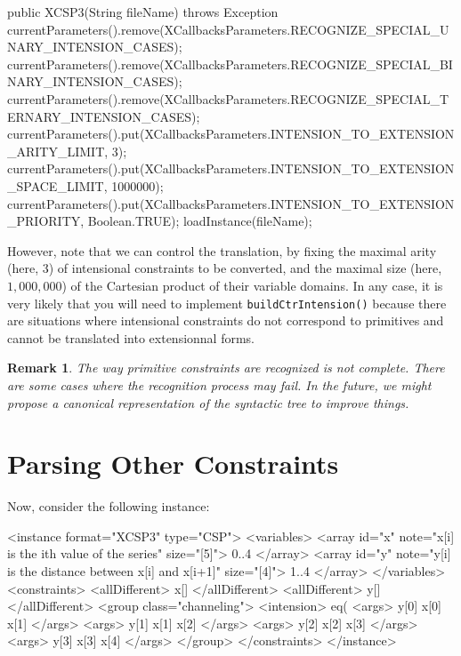 \documentclass[10pt]{article}
\newenvironment{boxabsc}
               {\medskip \begin{bclogo}[barre=none,arrondi=0.2,logo=]{}\vspace{-0.6cm}}
               {\vspace{-0.1cm}\end{bclogo} \smallskip}
\newtheorem{remark}{Remark}
\newcommand{\nn}[1]{{\tt #1}} %
\begin{document}
\begin{boxabsc}
\begin{absc}
public XCSP3(String fileName) throws Exception {
  currentParameters().remove(XCallbacksParameters.RECOGNIZE_SPECIAL_UNARY_INTENSION_CASES);
  currentParameters().remove(XCallbacksParameters.RECOGNIZE_SPECIAL_BINARY_INTENSION_CASES); 
  currentParameters().remove(XCallbacksParameters.RECOGNIZE_SPECIAL_TERNARY_INTENSION_CASES);
  currentParameters().put(XCallbacksParameters.INTENSION_TO_EXTENSION_ARITY_LIMIT, 3); 
  currentParameters().put(XCallbacksParameters.INTENSION_TO_EXTENSION_SPACE_LIMIT, 1000000);
  currentParameters().put(XCallbacksParameters.INTENSION_TO_EXTENSION_PRIORITY, Boolean.TRUE);
  loadInstance(fileName); 
}
\end{absc} 
\end{boxabsc}

However, note that we can control the translation, by fixing the maximal arity (here, 3) of intensional constraints to be converted, and the maximal size (here, $1,000,000$) of the Cartesian product of their variable domains. 
In any case, it is very likely that you will need to implement \nn{buildCtrIntension()} because there are situations where intensional constraints do not correspond to primitives and cannot be translated into extensionnal forms.


\begin{remark}
The way primitive constraints are recognized is not complete. There are some cases where the recognition process may fail.
In the future, we might propose a canonical representation of the syntactic tree to improve things.
\end{remark}

\section{Parsing Other Constraints}

Now, consider the following instance:

\begin{boxabsc}
\begin{absc}
<instance format="XCSP3" type="CSP">
  <variables>
    <array id="x" note="x[i] is the ith value of the series" size="[5]"> 0..4 </array>
    <array id="y" note="y[i] is the distance between x[i] and x[i+1]" size="[4]"> 1..4 </array>
  </variables>
  <constraints>
    <allDifferent> x[] </allDifferent>
    <allDifferent> y[] </allDifferent>
    <group class="channeling">
      <intension> eq(%
      <args> y[0] x[0] x[1] </args>
      <args> y[1] x[1] x[2] </args>
      <args> y[2] x[2] x[3] </args>
      <args> y[3] x[3] x[4] </args>
    </group>
  </constraints>
</instance>
\end{absc} 
\end{boxabsc}
\end{document}
